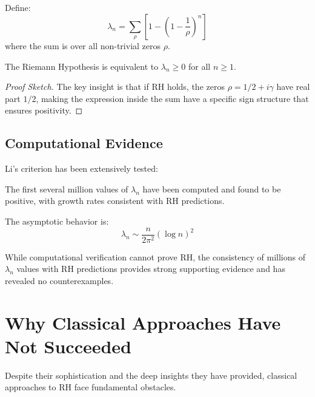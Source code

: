 \begin{definition}
Define:
\begin{equation}
\lambda_n = \sum_{\rho} \left[1 - \left(1 - \frac{1}{\rho}\right)^n\right]
\end{equation}
where the sum is over all non-trivial zeros $\rho$.
\end{definition}

\begin{theorem}[Li's Criterion]
The Riemann Hypothesis is equivalent to $\lambda_n \geq 0$ for all $n \geq 1$.
\end{theorem}

\begin{proof}[Proof Sketch]
The key insight is that if RH holds, the zeros $\rho = 1/2 + i\gamma$ have real part $1/2$, making the expression inside the sum have a specific sign structure that ensures positivity.
\end{proof}

\subsection{Computational Evidence}

Li's criterion has been extensively tested:

\begin{theorem}
The first several million values of $\lambda_n$ have been computed and found to be positive, with growth rates consistent with RH predictions.
\end{theorem}

The asymptotic behavior is:
\begin{equation}
\lambda_n \sim \frac{n}{2\pi^2} (\log n)^2
\end{equation}

\begin{remark}
While computational verification cannot prove RH, the consistency of millions of $\lambda_n$ values with RH predictions provides strong supporting evidence and has revealed no counterexamples.
\end{remark}

\section{Why Classical Approaches Have Not Succeeded}

Despite their sophistication and the deep insights they have provided, classical approaches to RH face fundamental obstacles.

